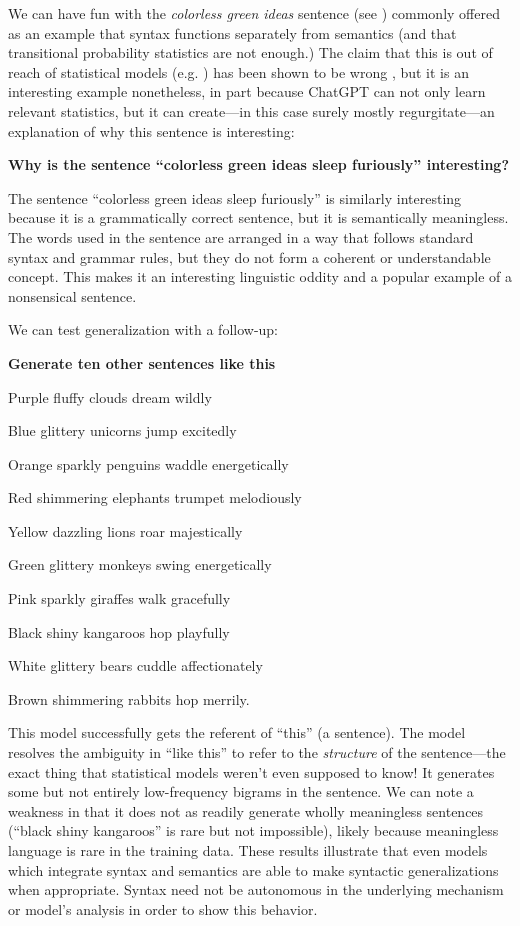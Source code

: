 \documentclass[output=paper,colorlinks,citecolor=brown
]{langscibook}
\begin{document}
We can have fun with the \emph{colorless green ideas} sentence (see \cite{gulordava2018colorless}) commonly offered as an example that syntax functions separately from semantics (and that transitional probability statistics are not enough.) The claim that this is out of reach of statistical models (e.g. \cite{chomsky1957syntactic}) has been shown to be wrong \citep{pereira2000formal,norvig2012colorless,gulordava2018colorless}, but it is an interesting example nonetheless, in part because ChatGPT can not only learn relevant statistics, but it can create---in this case surely mostly regurgitate---an explanation of why this sentence is interesting:
\begin{myquote}
\textbf{Why is the sentence ``colorless green ideas sleep furiously'' interesting?}

The sentence ``colorless green ideas sleep furiously'' is similarly interesting because it is a grammatically correct sentence, but it is semantically meaningless. The words used in the sentence are arranged in a way that follows standard syntax and grammar rules, but they do not form a coherent or understandable concept. This makes it an interesting linguistic oddity and a popular example of a nonsensical sentence.
\end{myquote}
\noindent We can test generalization with a follow-up:
\begin{myquote}
\textbf{Generate ten other sentences like this}

Purple fluffy clouds dream wildly

Blue glittery unicorns jump excitedly

Orange sparkly penguins waddle energetically

Red shimmering elephants trumpet melodiously

Yellow dazzling lions roar majestically

Green glittery monkeys swing energetically

Pink sparkly giraffes walk gracefully

Black shiny kangaroos hop playfully

White glittery bears cuddle affectionately

Brown shimmering rabbits hop merrily.
\end{myquote}
\noindent This model successfully gets the referent of ``this'' (a sentence). The model resolves the ambiguity in ``like this'' to refer to the \emph{structure} of the sentence---the exact thing that statistical models weren't even supposed to know! It generates some but not entirely low-frequency bigrams in the sentence. We can note a weakness in that it does not as readily generate wholly meaningless sentences (``black shiny kangaroos'' is rare but not impossible), likely because meaningless language is rare in the training data. These results illustrate that even models which integrate syntax and semantics are able to make syntactic generalizations when appropriate. Syntax need not be autonomous in the underlying mechanism or model's analysis in order to show this behavior. 
\end{document}
